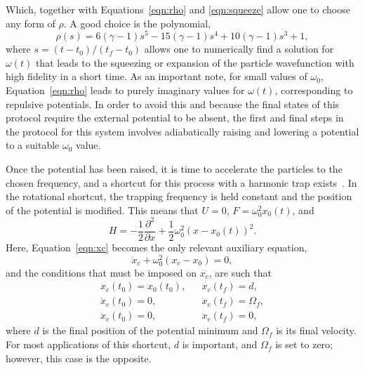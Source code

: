 Which, together with Equations~\eqref{eqn:rho} and \eqref{eqn:squeeze} allow one to choose any form of $\rho$.
A good choice is the polynomial,
\begin{equation}
 \rho (s) = 6 \left(\gamma -1\right) s^5 -15 \left(\gamma-1\right) s^4 +10 \left(\gamma-1\right)s^3 + 1, \label{eq:rho_pol}
\end{equation}
\noindent where $s=(t-t_0)/(t_f-t_0)$ allows one to numerically find a solution for $\omega(t)$ that leads to the squeezing or expansion of the particle wavefunction with high fidelity in a short time.
As an important note, for small values of $\omega_0$, Equation~\eqref{eqn:rho} leads to purely imaginary values for $\omega(t)$, corresponding to repulsive potentials.
In order to avoid this and because the final states of this protocol require the external potential to be absent, the first and final steps in the protocol for this system involves adiabatically raising and lowering a potential to a suitable $\omega_0$ value. 

Once the potential has been raised, it is time to accelerate the particles to the chosen frequency, and a shortcut for this process with a harmonic trap exists~\cite{masuda2009,torrontegui2011,masuda2012}.
In the rotational shortcut, the trapping frequency is held constant and the position of the potential is modified.
This means that $U=0$, $F=\omega_0^2 x_0(t)$, and
\begin{equation}
 H= -\frac{1}{2} \frac{\partial^2}{\partial x}+ \frac 1 2 \omega^2_0 (x-x_0(t))^2.
\end{equation}
\noindent Here, Equation~\eqref{eqn:xc} becomes the only relevant auxiliary equation,
\begin{equation}
 \ddot{x}_c+\omega^2_0 (x_c-x_0)=0,
\end{equation}
and the conditions that must be imposed on $x_c$, are such that
\begin{equation}
 \begin{array}{lcl}
x_c(t_0)=x_0(t_0), && x_c(t_f)=d,\\
\dot x_c(t_0)=0, && \dot x_c(t_f) =\Omega_f, \\
\ddot x_c(t_0)=0, && \ddot x_c(t_f)=0,
\end{array}
\end{equation}
\noindent where $d$ is the final position of the potential minimum and $\Omega_f$ is its final velocity. 
For most applications of this shortcut, $d$ is important, and $\Omega_f$ is set to zero; however, this case is the opposite.


